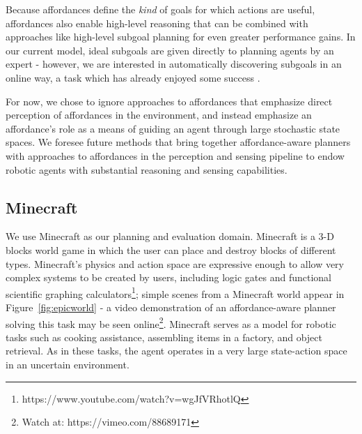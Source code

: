 \documentclass[letterpaper]{article}
\begin{document}
Because affordances define the {\em kind} of goals for which actions are useful,
affordances also enable high-level reasoning that can
be combined with approaches like high-level subgoal planning for even
greater performance gains. In our current model, ideal subgoals are given directly
to planning agents by an expert - however, we are interested in automatically
discovering subgoals in an online way, a task which has already enjoyed some success \cite{Mcgovern01automaticdiscovery, Simsek:2005:IUS:1102351.1102454}.

For now, we chose to ignore approaches to affordances that emphasize
direct perception of affordances in the environment, and instead emphasize an
affordance's role as a means of guiding an agent through large stochastic state spaces. We foresee
future methods that bring together affordance-aware planners with approaches to affordances
in the perception and sensing pipeline to endow robotic agents with substantial reasoning and sensing capabilities.

\subsection{Minecraft}

We use Minecraft as our planning and evaluation domain. Minecraft is a
3-D blocks world game in which the user can place and destroy blocks
of different types.  Minecraft's physics and action space are expressive
enough to allow very complex systems to be created by users, including logic gates and 
functional scientific graphing calculators\footnote{https://www.youtube.com/watch?v=wgJfVRhotlQ};
simple scenes from a Minecraft world appear in Figure~\ref{fig:epicworld} - a video demonstration of
an affordance-aware planner solving this task may be seen online\footnote{Watch at: https://vimeo.com/88689171}.
Minecraft serves as a model for robotic tasks such as cooking assistance, assembling items in a factory, 
and object retrieval.  As in these tasks, the agent operates in a very large state-action space in an uncertain environment.
\end{document}

